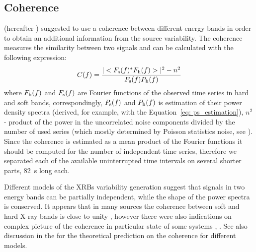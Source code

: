 \documentclass[a4paper,fleqn,usenatbib]{mnras}
\begin{document}

\subsection{Coherence}

\citet{1997ApJ...474L..43V}(hereafter ) suggested to use a coherence between different energy bands in order to obtain an additional information from the source variability. 
The coherence measures the similarity between two signals and can be calculated with the following expression:
\begin{equation}
        C(f) = \frac{|<F_{\rm s}(f)^*F_{\rm h}(f)>|^2 - n^2}{P_{\rm s}(f) P_{\rm h}(f)}
    \label{eq:nowak_coh}
\end{equation}
where $F_{\rm h}(f)$ and $F_{\rm s}(f)$ are Fourier functions of the observed time series in hard and soft bands, correspondingly, $P_{\rm s}(f)$ and $P_{\rm h}(f)$ is estimation of their power density spectra (derived, for example, with the Equation~\ref{eq: ps_estimation}),  
$n^2$ - product of the power in the uncorrelated noise components divided by the number of used series (which mostly determined by Poisson statistics noise, see ). 
Since the coherence is estimated as a mean product of the Fourier functions it should be computed for the number of independent time series, therefore we separated each of the available uninterrupted time intervals on several shorter parts, 82~s long each.  


Different models of the XRBs variability generation suggest that signals in two energy bands can be partially independent, while the shape of the power spectra is conserved.
It appears that in many sources the coherence between soft and hard X-ray bands is close to unity \citep{1999ApJ...517..355N, wijnands99}, however there were also indications  on complex picture of the coherence in particular state of some systems \citep[dip in the coherence at 0.03~Hz frequency, observed in GRS1915+105, ][]{2003ApJ...584L..23J}, \citep[decreasing of the coherence between particular energy bandse in GX 339--4, ][]{1997ApJ...474L..43V}.
See also discussion in the  for the theoretical prediction on the coherence for different models.
\end{document}
